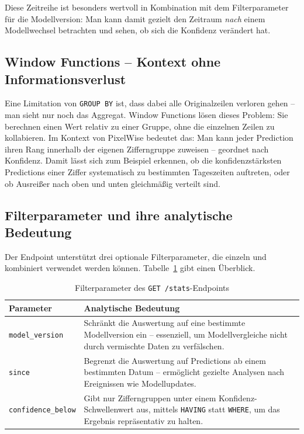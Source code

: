 \documentclass[12pt, a4paper]{article}
\begin{document}
Diese Zeitreihe ist besonders wertvoll in Kombination mit dem
Filterparameter für die Modellversion: Man kann damit gezielt den Zeitraum
\emph{nach} einem Modellwechsel betrachten und sehen, ob sich die Konfidenz
verändert hat.

\subsection{Window Functions -- Kontext ohne Informationsverlust}

Eine Limitation von \texttt{GROUP BY} ist, dass dabei alle Originalzeilen
verloren gehen -- man sieht nur noch das Aggregat. Window Functions lösen
dieses Problem: Sie berechnen einen Wert relativ zu einer Gruppe, ohne die
einzelnen Zeilen zu kollabieren. Im Kontext von PixelWise bedeutet das: Man
kann jeder Prediction ihren Rang innerhalb der eigenen Zifferngruppe zuweisen
-- geordnet nach Konfidenz. Damit lässt sich zum Beispiel erkennen, ob die
konfidenzstärksten Predictions einer Ziffer systematisch zu bestimmten
Tageszeiten auftreten, oder ob Ausreißer nach oben und unten gleichmäßig
verteilt sind.

\subsection{Filterparameter und ihre analytische Bedeutung}

Der Endpoint unterstützt drei optionale Filterparameter, die einzeln und
kombiniert verwendet werden können. Tabelle~\ref{tab:filter} gibt einen
Überblick.

\begin{table}[h]
\centering
\caption{Filterparameter des \texttt{GET /stats}-Endpoints}
\label{tab:filter}
\begin{tabular}{lp{10.5cm}}
  \toprule
  \textbf{Parameter} & \textbf{Analytische Bedeutung} \\
  \midrule
  \texttt{model\_version} &
    Schränkt die Auswertung auf eine bestimmte Modellversion ein --
    essenziell, um Modellvergleiche nicht durch vermischte Daten zu
    verfälschen. \\[0.4em]
  \texttt{since} &
    Begrenzt die Auswertung auf Predictions ab einem bestimmten Datum --
    ermöglicht gezielte Analysen nach Ereignissen wie Modellupdates. \\[0.4em]
  \texttt{confidence\_below} &
    Gibt nur Zifferngruppen unter einem Konfidenz-Schwellenwert aus, mittels
    \texttt{HAVING} statt \texttt{WHERE}, um das Ergebnis repräsentativ zu
    halten. \\
  \bottomrule
\end{tabular}
\end{table}
\newpage
\end{document}
